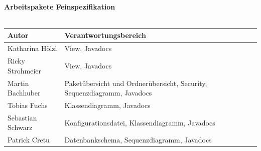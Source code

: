 \documentclass[a4paper, 12pt]{scrreprt}
\begin{document}
\begin{titlepage}
\begin{center}
        \ \\
        \ \\
        \hspace{3 cm}\\
         \textbf{Arbeitspakete Feinspezifikation} \\
         \ \\
         
         \begin{tabular}{ | l | l |}
         	\hline
         	\textbf{Autor} & \textbf{Verantwortungsbereich} \\ \hline
         	Katharina Hölzl & View, Javadocs \\ \hline
         	Ricky Strohmeier& View, Javadocs \\ \hline
         	Martin Bachhuber & Paket\"{u}bersicht und Ordner\"{u}bersicht, Security, Sequenzdiagramm, Javadocs  \\ \hline
         	Tobias Fuchs & Klassendiagramm, Javadocs \\ \hline
         	Sebastian Schwarz & Konfigurationsdatei, Klassendiagramm, Javadocs \\ \hline  
         	Patrick Cretu  &  Datenbankschema, Sequenzdiagramm, Javadocs  \\ \hline
         \end{tabular}
        
        
    \end{center}
\end{titlepage}



\tableofcontents










\end{document}
